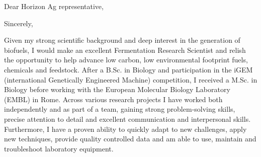 \documentclass[11pt,a4paper,sans]{moderncv}
\begin{document}
\date{\today}
\opening{Dear Horizon Ag representative,\vspace{-2mm}}
\closing{Sincerely,\vspace*{-4mm} }
\makelettertitle
\begin{spacing}{1.15}

Given my strong scientific background and deep interest in the generation of biofuels, I would make an excellent Fermentation Research Scientist and relish the opportunity to help advance low carbon, low environmental footprint fuels, chemicals and feedstock. After a B.Sc. in Biology and participation in the iGEM (international Genetically Engineered Machine) competition, I received a M.Sc. in Biology before working with the European Molecular Biology Laboratory (EMBL) in Rome. Across various research projects I have worked both independently and as part of a team, gaining strong problem-solving skills, precise attention to detail and excellent communication and interpersonal skills. Furthermore, I have a proven ability to quickly adapt to new challenges, apply new techniques, provide quality controlled data and am able to use, maintain and troubleshoot laboratory equipment.\par\vspace*{2mm}


\end{spacing}
\end{document}
